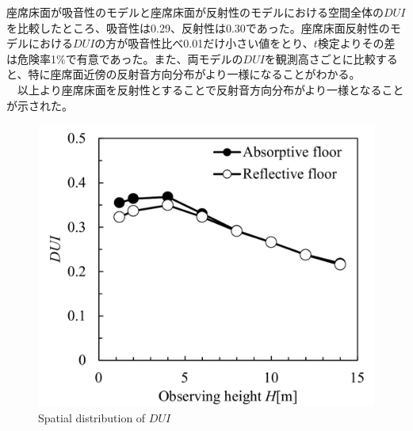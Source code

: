 座席床面が吸音性のモデルと座席床面が反射性のモデルにおける空間全体の$DUI$を比較したところ、吸音性は0.29、反射性は0.30であった。座席床面反射性のモデルにおける$DUI$の方が吸音性比べ0.01だけ小さい値をとり、$t$検定よりその差は危険率1$\%$で有意であった。また、両モデルの$DUI$を観測高さごとに比較すると、特に座席面近傍の反射音方向分布がより一様になることがわかる。\\
　以上より座席床面を反射性とすることで反射音方向分布がより一様となることが示された。
　
\begin{figure}[H]
    \centering
    \includegraphics[keepaspectratio,scale=0.7]{05_att/reflect/DUI_ref2.pdf}
    \caption{\hspace{1mm}Spatial distribution of $DUI$}
    \label{fig:sankaku1_r}

\end{figure}